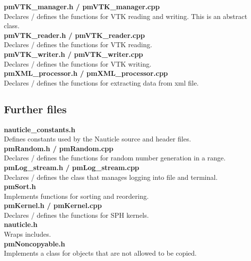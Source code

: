 \documentclass[a4paper,12pt,openany]{book}
\theoremstyle{break}
\begin{document}
\textbf{pmVTK\_manager.h / pmVTK\_manager.cpp} \\
Declares / defines the functions for VTK reading and writing. This is an abstract class. \\

\textbf{pmVTK\_reader.h / pmVTK\_reader.cpp} \\
Declares / defines the functions for VTK reading. \\

\textbf{pmVTK\_writer.h / pmVTK\_writer.cpp} \\
Declares / defines the functions for VTK writing. \\

\textbf{pmXML\_processor.h / pmXML\_processor.cpp} \\
Declares / defines the functions for extracting data from xml file. \\

\subsection{Further files}
\textbf{nauticle\_constants.h} \\
Defines constants used by the Nauticle source and header files. \\

\textbf{pmRandom.h / pmRandom.cpp} \\
Declares / defines the functions for random number generation in a range. \\

\textbf{pmLog\_stream.h / pmLog\_stream.cpp} \\
Declares / defines the class that manages logging into file and terminal. \\

\textbf{pmSort.h}\\
Implements functions for sorting and reordering.\\

\textbf{pmKernel.h / pmKernel.cpp} \\
Declares / defines the functions for SPH kernels.\\

\textbf{nauticle.h}\\
Wraps includes.\\

\textbf{pmNoncopyable.h}\\
Implements a class for objects that are not allowed to be copied.\\
\end{document}
